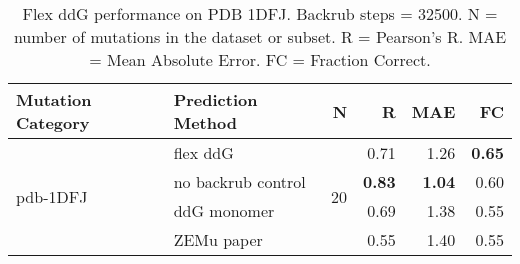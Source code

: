 \begin{table}
  \begin{tabular}{llrrrr}
\toprule
Mutation Category &   Prediction Method &   N &    R &  MAE &   FC \\
\midrule
 \multirow{ 4}{*}{pdb-1DFJ} & flex ddG & \multirow{ 4}{*}{20} & 0.71 & 1.26 & \textbf{0.65}  \\
 & no backrub control & & \textbf{0.83} & \textbf{1.04} & 0.60  \\
 & ddG monomer & & 0.69 & 1.38 & 0.55  \\
 & ZEMu paper & & 0.55 & 1.40 & 0.55  \\
\bottomrule
\end{tabular}
  \caption[Flex ddG performance on PDB 1DFJ]{
    Flex ddG performance on PDB 1DFJ. Backrub steps = 32500. N = number of mutations in the dataset or subset. R = Pearson's R. MAE = Mean Absolute Error. FC = Fraction Correct.
  } \label{tab:table-pdb-1DFJ}
\end{table}
